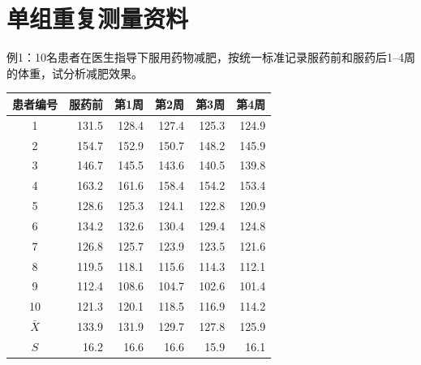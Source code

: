 \section{单组重复测量资料}
例1：10名患者在医生指导下服用药物减肥，按统一标准记录服药前和服药后1--4周的体重，试分析减肥效果。
\par\noindent\begin{minipage}{\linewidth}
\begin{center}\small\begin{tabular}{crrrrr}
\toprule 患者编号&服药前&第1周&第2周&第3周&第4周\\\midrule
1&131.5&128.4&127.4&125.3&124.9\\
2&154.7&152.9&150.7&148.2&145.9\\
3&146.7&145.5&143.6&140.5&139.8\\
4&163.2&161.6&158.4&154.2&153.4\\
5&128.6&125.3&124.1&122.8&120.9\\
6&134.2&132.6&130.4&129.4&124.8\\
7&126.8&125.7&123.9&123.5&121.6\\
8&119.5&118.1&115.6&114.3&112.1\\
9&112.4&108.6&104.7&102.6&101.4\\
10&121.3&120.1&118.5&116.9&114.2\\\midrule
$\bar X$&133.9&131.9&129.7&127.8&125.9\\
$S$&16.2&16.6&16.6&15.9&16.1\\\bottomrule
\end{tabular}\end{center}
\end{minipage}\par\medskip

